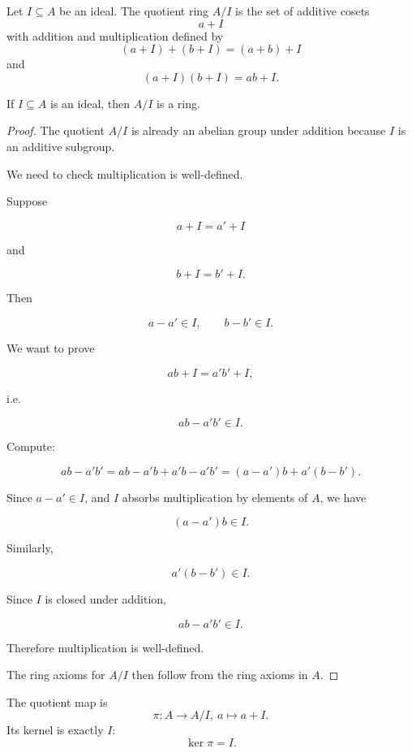 \documentclass[11pt]{article}
\begin{document}
\begin{defn}
    Let $I \subseteq A$ be an ideal. The quotient ring 
    $A/I$ is the set of additive cosets 
    \[
        a + I
    \]
    with addition and multiplication defined by 
    \[
        (a+I) + (b+I) = (a+b) + I
    \]
    and 
    \[
        (a+I)(b+I) = ab + I. 
    \]
\end{defn}
\begin{prop}
    If $I \subseteq A$ is an ideal, then $A/I$ is a ring. 
\end{prop}
\begin{proof}
    The quotient $A/I$ is already an abelian group under addition because $I$ is an additive subgroup.

    We need to check multiplication is well-defined.

    Suppose

    $$a+I=a'+I$$

    and

    $$b+I=b'+I.$$

    Then

    $$a-a'\in I,\qquad b-b'\in I.$$

    We want to prove

    $$ab+I=a'b'+I,$$

    i.e.

    $$ab-a'b'\in I.$$

    Compute:

    $$ab-a'b'=ab-a'b+a'b-a'b'=(a-a')b+a'(b-b').$$

    Since $a-a'\in I$, and $I$ absorbs multiplication by elements of $A$, we have

    $$(a-a')b\in I.$$

    Similarly,

    $$a'(b-b')\in I.$$

    Since $I$ is closed under addition,

    $$ab-a'b'\in I.$$

    Therefore multiplication is well-defined.

    The ring axioms for $A/I$ then follow from the ring axioms in $A$.
\end{proof}
The quotient map is 
\[
    \pi : A \to A/I, \ a \mapsto a + I.
\]
Its kernel is exactly $I$: 
\[
    \ker \pi = I. 
\]
\end{document}
